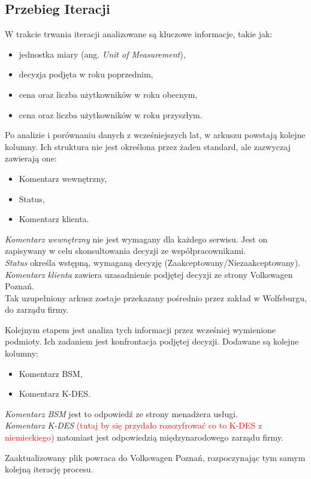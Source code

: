 \subsection{Przebieg Iteracji}
W trakcie trwania iteracji analizowane są kluczowe informacje, takie jak:
\begin{itemize}
\item jednostka miary (ang. \emph{Unit of Measurement}),
\item decyzja podjęta w roku poprzednim,
\item cena oraz liczba użytkowników w roku obecnym,
\item cena oraz liczba użytkowników w roku przyszłym.
\end{itemize}
Po analizie i porównaniu danych z wcześniejszych lat, w arkuszu powstają kolejne kolumny. Ich struktura nie jest określona przez żaden standard, ale zazwyczaj zawierają one:
\begin{itemize}
\item Komentarz wewnętrzny,
\item Status,
\item Komentarz klienta.
\end{itemize}

\noindent\emph{Komentarz wewnętrzny} nie jest wymagany dla każdego serwisu. Jest on zapisywany w celu skonsultowania decyzji ze współpracownikami.\\ \emph{Status} określa wstępną, wymaganą decyzję (Zaakceptowany/Niezaakceptowany).\\ \emph{Komentarz klienta} zawiera uzasadnienie podjętej decyzji ze strony Volkswagen Poznań.\\Tak uzupełniony arkusz zostaje przekazany pośrednio przez zakład w Wolfsburgu, do zarządu firmy. \par
Kolejnym etapem jest analiza tych informacji przez wcześniej wymienione podmioty. Ich zadaniem jest konfrontacja podjętej decyzji. Dodawane są kolejne kolumny:
\begin{itemize}
    \item Komentarz BSM,
    \item Komentarz K-DES.
\end{itemize}

\noindent\emph{Komentarz BSM} jest to odpowiedź ze strony menadżera usługi.\\ \emph{Komentarz K-DES} \textcolor{red}{(tutaj by się przydało rozszyfrować co to K-DES z niemieckiego)} natomiast jest odpowiedzią międzynarodowego zarządu firmy.\par
Zaaktualizowany plik powraca do Volkswagen Poznań, rozpoczynając tym samym kolejną iterację procesu.





